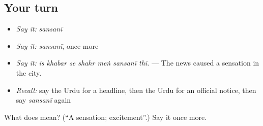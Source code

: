 \subsection*{Your turn}
\begin{itemize}
\raggedright
  \item \emph{Say it:} \emph{sansanī}
  \item \emph{Say it:} \emph{sansanī}, once more
  \item \emph{Say it:} \emph{is khabar se shahr meṅ sansanī thī.} — The news caused a sensation in the city.
  \item \emph{Recall:} say the Urdu for a headline, then the Urdu for an official notice, then say \emph{sansanī} again
\end{itemize}

\begin{tcolorbox}[breakable,colback=teal!4,colframe=teal!35!black,title={Before you move on}]
What does  mean? (\textquotedblleft{}A sensation; excitement\textquotedblright{}.) Say it once more.
\end{tcolorbox}
